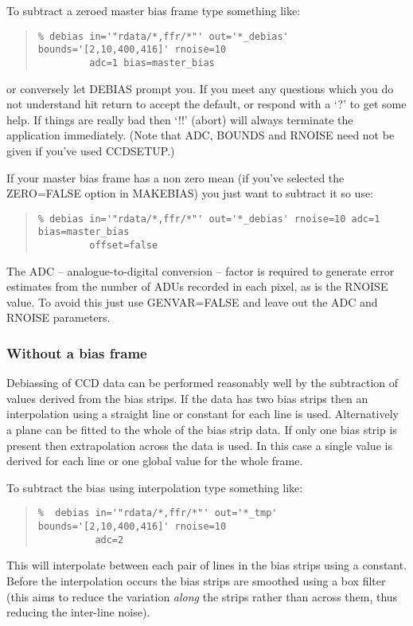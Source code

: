 \documentclass[twoside,11pt]{article}
\newcommand{\htmlref}[2]{#1}
\newcommand{\latexhtml}[2]{#1}
\newcommand{\xlabel}[1]{}
\renewcommand{\_}{\texttt{\symbol{95}}}
\newcommand{\ttsize}{\latexhtml{\small}{}}
\newenvironment{myquote}{\begin{quote}\ttsize}{\end{quote}}
\newcommand{\routine}[1]{{\sc #1}}
\newcommand{\xroutine}[1]{\htmlref{{\sc #1}}{#1}}
\begin{document}
To subtract a zeroed master bias frame type something like:
\begin{myquote}
\begin{verbatim}
% debias in='"rdata/*,ffr/*"' out='*_debias' bounds='[2,10,400,416]' rnoise=10
         adc=1 bias=master_bias
\end{verbatim}
\end{myquote}
or conversely let \routine{DEBIAS} prompt you. If you meet any questions which you
do not understand hit return to accept the default, or respond with a
`?' to get some help. If things are really bad then `!!' (abort) will
always terminate the application immediately. (Note that ADC,
BOUNDS and RNOISE need not be given if you've used
\xroutine{CCDSETUP}.)

If your master bias frame has a non zero mean (if you've selected
the ZERO=FALSE option in \routine{MAKEBIAS}) you just want to subtract
it so use:
\begin{myquote}
\begin{verbatim}
% debias in='"rdata/*,ffr/*"' out='*_debias' rnoise=10 adc=1 bias=master_bias
         offset=false
\end{verbatim}
\end{myquote}
The ADC  -- analogue-to-digital conversion --  factor is
required to generate error estimates from the number of ADUs recorded in
each pixel, as is the RNOISE value.
To avoid this just use GENVAR=FALSE and leave out the
ADC and RNOISE parameters.

\subsubsection{\xlabel{nobiasframes}\label{nobiasframes}Without a bias frame}

Debiassing of CCD data can be performed reasonably well by the
subtraction of values derived from the bias strips.
If the data has two bias strips then an interpolation using a straight
line or constant for each line is used.
Alternatively a plane can be fitted to the whole of the bias strip data.
If only one bias strip is present then extrapolation across the data
is used. In this case a single value is derived for each line or
one global value for the whole frame.

To subtract the bias using interpolation type something like:
\begin{myquote}
\begin{verbatim}
%  debias in='"rdata/*,ffr/*"' out='*_tmp' bounds='[2,10,400,416]' rnoise=10
          adc=2
\end{verbatim}
\end{myquote}
This will interpolate between each pair of lines in the bias strips
using a  constant. Before the interpolation occurs the bias strips are
smoothed using a box filter (this aims to reduce the variation {\em along}
the strips rather than across them, thus reducing the inter-line noise).
\end{document}
